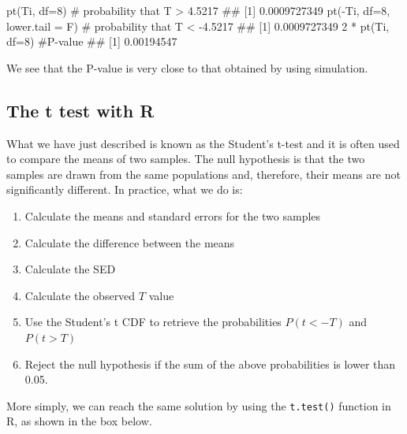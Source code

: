 \documentclass[a4paper,12pt,oneside]{book}
\providecommand{\tightlist}{%
  \setlength{\itemsep}{0pt}\setlength{\parskip}{0pt}}
\newenvironment{Shaded}{\begin{snugshade}}{\end{snugshade}}
\newcommand{\DecValTok}[1]{#1}
\newcommand{\SpecialCharTok}[1]{#1}
\newcommand{\CommentTok}[1]{#1}
\newcommand{\DocumentationTok}[1]{#1}
\newcommand{\FunctionTok}[1]{#1}
\newcommand{\AttributeTok}[1]{#1}
\newcommand{\NormalTok}[1]{#1}
\begin{document}
\begin{Shaded}
\begin{Highlighting}[]
\FunctionTok{pt}\NormalTok{(Ti, }\AttributeTok{df=}\DecValTok{8}\NormalTok{) }\CommentTok{\# probability that T \textgreater{} 4.5217}
\DocumentationTok{\#\# [1] 0.0009727349}
\FunctionTok{pt}\NormalTok{(}\SpecialCharTok{{-}}\NormalTok{Ti, }\AttributeTok{df=}\DecValTok{8}\NormalTok{, }\AttributeTok{lower.tail =}\NormalTok{ F) }\CommentTok{\# probability that T \textless{} {-}4.5217}
\DocumentationTok{\#\# [1] 0.0009727349}
\DecValTok{2} \SpecialCharTok{*} \FunctionTok{pt}\NormalTok{(Ti, }\AttributeTok{df=}\DecValTok{8}\NormalTok{) }\CommentTok{\#P{-}value}
\DocumentationTok{\#\# [1] 0.00194547}
\end{Highlighting}
\end{Shaded}

We see that the P-value is very close to that obtained by using simulation.

\hypertarget{the-t-test-with-r}{%
\subsection{The t test with R}\label{the-t-test-with-r}}

What we have just described is known as the Student's t-test and it is often used to compare the means of two samples. The null hypothesis is that the two samples are drawn from the same populations and, therefore, their means are not significantly different. In practice, what we do is:

\begin{enumerate}
\def\labelenumi{\arabic{enumi}.}
\tightlist
\item
  Calculate the means and standard errors for the two samples
\item
  Calculate the difference between the means
\item
  Calculate the SED
\item
  Calculate the observed \(T\) value
\item
  Use the Student's t CDF to retrieve the probabilities \(P(t < -T)\) and \(P(t > T)\)
\item
  Reject the null hypothesis if the sum of the above probabilities is lower than 0.05.
\end{enumerate}

More simply, we can reach the same solution by using the \texttt{t.test()} function in R, as shown in the box below.
\end{document}
